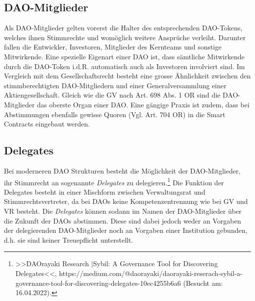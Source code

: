 \documentclass[a4paper,12pt]{report}
\begin{document}
	\subsection{DAO-Mitglieder}
	\startsubsection
	Als DAO-Mitglieder gelten vorerst die Halter des entsprechenden DAO-Tokens, welches ihnen Stimmrechte und womöglich weitere Ansprüche verleiht. Darunter fallen die Entwickler, Investoren, Mitglieder des Kernteams und sonstige Mitwirkende. Eine spezielle Eigenart einer DAO ist, dass sämtliche Mitwirkende durch die DAO-Token i.d.R. automatisch auch als Investoren involviert sind. Im Vergleich mit dem Gesellschaftsrecht besteht eine grosse Ähnlichkeit zwischen den stimmberechtigten DAO-Mitgliedern und einer Generalversammlung einer Aktiengesellschaft. Gleich wie die GV nach Art. 698 Abs. 1 OR sind die DAO-Mitglieder das oberste Organ einer DAO. Eine gängige Praxis ist zudem, dass bei Abstimmungen ebenfalls gewisse Quoren (Vgl. Art. 704 OR) in die Smart Contracts eingebaut werden.
	\closesection
	
	\subsection{Delegates}
	\startsubsection
    Bei moderneren DAO Strukturen besteht die Möglichkeit der DAO-Mitglieder, ihr Stimmrecht an sogenannte \textit{Delegates} zu delegieren.\footnote{\hspace{0.5em}\begin{minipage}[t]{13cm}>>DAOrayaki Research |Sybil: A Governance Tool for Discovering Delegates<<, https://medium.com/@daorayaki/daorayaki-reserach-sybil-a-governance-tool-for-discovering-delegates-10ec4255b6a6 (Besucht am: 16.04.2022).\end{minipage}} Die Funktion der Delegates besteht in einer Mischform zwischen Verwaltungsrat und Stimmrechtsvertreter, da bei DAOs keine Kompetenzentrennung wie bei GV und VR besteht. Die \textit{Delegates} können sodann im Namen der DAO-Mitglieder über die Zukunft der DAOs abstimmen. Diese sind dabei jedoch weder an Vorgaben der delegierenden DAO-Mitglieder noch an Vorgaben einer Institution gebunden, d.h. sie sind keiner Treuepflicht unterstellt.
	\closesection
	\closesection
\end{document}
